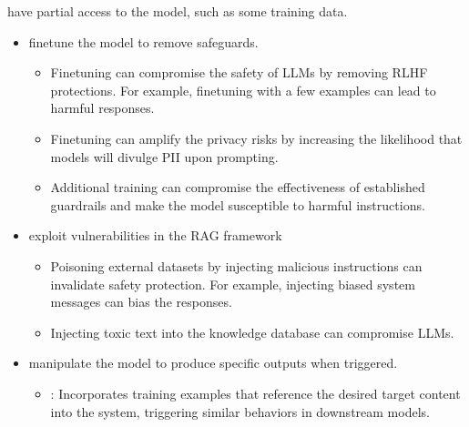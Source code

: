 \documentclass[letterpaper,11pt,english]{sphinxmanual}
\begin{document}
\sphinxAtStartPar
{} have partial access to the model, such as
some training data.
\begin{itemize}
\item {} 
\sphinxAtStartPar
{} fine\sphinxhyphen{}tune the model to remove safeguards.
\begin{itemize}
\item {} 
\sphinxAtStartPar
Fine\sphinxhyphen{}tuning can compromise the safety of LLMs by removing RLHF
protections. For example, fine\sphinxhyphen{}tuning with a few examples can lead
to harmful responses.

\item {} 
\sphinxAtStartPar
Fine\sphinxhyphen{}tuning can amplify the privacy risks by increasing the
likelihood that models will divulge PII upon prompting.

\item {} 
\sphinxAtStartPar
Additional training can compromise the effectiveness of established
guardrails and make the model susceptible to harmful instructions.

\end{itemize}

\item {} 
\sphinxAtStartPar
{} exploit
vulnerabilities in the RAG framework
\begin{itemize}
\item {} 
\sphinxAtStartPar
Poisoning external datasets by injecting malicious instructions can
invalidate safety protection. For example, injecting biased system
messages can bias the responses.

\item {} 
\sphinxAtStartPar
Injecting toxic text into the knowledge database can compromise
LLMs.

\end{itemize}

\item {} 
\sphinxAtStartPar
{} manipulate the model to produce specific outputs
when triggered.
\begin{itemize}
\item {} 
\sphinxAtStartPar
{}: Incorporates training examples that reference the
desired target content into the system, triggering similar behaviors
in downstream models.


\end{itemize}
\end{itemize}
\end{document}
